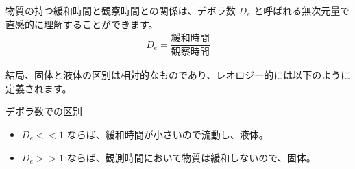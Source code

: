 \documentclass[uplatex,dvipdfmx,a4paper,11pt]{jsarticle}
\begin{document}
物質の持つ緩和時間と観察時間との関係は、デボラ数 $D_e$ と呼ばれる無次元量で直感的に理解することができます。
\begin{align*}
	D_e = \dfrac{\text{緩和時間}}{\text{観察時間}}
\end{align*}

結局、固体と液体の区別は相対的なものであり、レオロジー的には以下のように定義されます。

	\begin{center}
		\begin{minipage}{0.9\textwidth}
			\begin{center}
				\begin{itembox}[l]{デボラ数での区別}
					\begin{itemize}
						\item $D_e << 1$ ならば、緩和時間が小さいので流動し、液体。
						\item $D_e >> 1$ ならば、観測時間において物質は緩和しないので、固体。
					\end{itemize}
				\end{itembox}
			\end{center}
		\end{minipage}
	\end{center}
\end{document}
